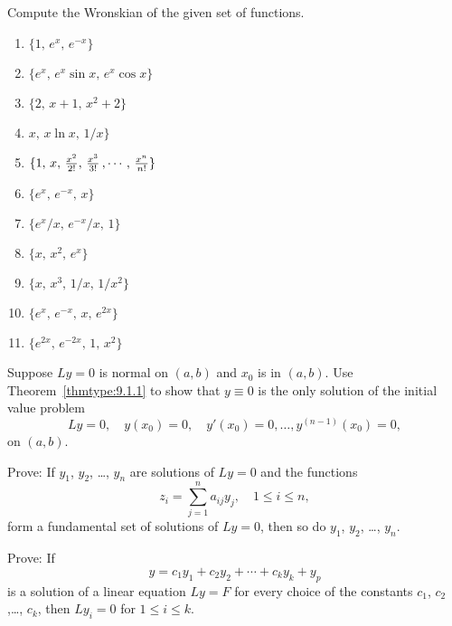\documentclass{ximera}
\begin{document}
\begin{problem}\label{exer:9.1.10}
Compute the Wronskian of the given set of functions.

\begin{enumerate}
\item  $\{1,\,e^x,\,e^{-x}\}$

\item $\{e^x,\, e^x\sin x,\,e^x\cos x\}$

\item $\{2,\,x+1,\,x^2+2\}$

\item $ x,\,x\ln x,\,1/x\}$

\item $\{1,\,x,\,{x^2\over2!},\,
\frac{x^3}{3!}\,,\cdots,\,\frac{x^n}{n!}\}$

\item $\{e^x,\,e^{-x},\,x\}$

\item $\{e^x/x,\,e^{-x}/x,\,1\}$

\item $\{x,\,x^2,\,e^x\}$

\item $\{x,\,x^3,\,1/x,\,1/x^2\}$

\item $\{e^x,\,e^{-x},\,x,\,e^{2x}\}$

\item $\{e^{2x},\,e^{-2x},\,1,\,x^2\}$
\end{enumerate}
\end{problem}

\begin{problem}\label{exer:9.1.11}
Suppose $Ly=0$ is normal on $(a,b)$ and $x_0$ is in $(a,b)$. Use
Theorem~\ref{thmtype:9.1.1} to show that $y\equiv0$ is the only solution
of the initial value problem
$$
Ly=0, \quad  y(x_0)=0,\quad y'(x_0)=0,\dots, y^{(n-1)}(x_0)=0,
$$
on $(a,b)$.
\end{problem}

\begin{problem}\label{exer:9.1.12}
Prove:  If $y_1$, $y_2$, \dots, $y_n$ are solutions of $Ly=0$ and the
functions
$$
z_i=\sum^n_{j=1}a_{ij}y_j,\quad 1\le i\le n,
$$
form a fundamental set of solutions of $Ly=0$, then so do $y_1$, $y_2$,
\dots, $y_n$.
\end{problem}

\begin{problem}\label{exer:9.1.13}
Prove:  If
$$
y=c_1y_1+c_2y_2+\cdots+c_ky_k+y_p
$$
is a solution of a linear equation $Ly=F$ for every choice of the
constants $c_1$, $c_2$ ,\dots, $c_k$, then $Ly_i=0$ for $1\le i\le k$.
\end{problem}
\end{document}
